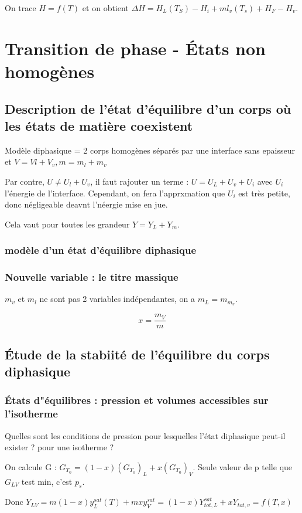 \documentclass[french]{yLectureNote}
\begin{document}
On trace $H=f(T)$ et on obtient $\Delta H = H_L(T_S)-H_i+ml_v(T_s)+H_F-H_v$.
\chapter{Transition de phase - États non homogènes}
\section{Description de l'état d'équilibre d'un corps où les états de matière coexistent}
Modèle diphasique = 2 corps homogènes séparés par une interface sans epaisseur et $V=Vl+V_v, m=m_l+m_v$

Par contre, $U \neq U_l+U_v$, il faut rajouter un terme : $U = U_L+U_v+U_i$ avec $U_i$ l'énergie de l'interface. Cependant, on fera l'apprxmation que $U_i$ est très petite, donc négligeable deavnt l'néergie mise en jue.

Cela vaut pour toutes les grandeur  $Y = Y_L+Y_m$.
\subsection{modèle d'un état d'équilibre diphasique}

\subsection{Nouvelle variable : le titre massique}
$m_v$ et $m_l$ ne sont pas 2 variables indépendantes, on a $m_L=m_m_v$.
\begin{definition}
    $$x = \frac{m_V}{m}$$
\end{definition}
\section{Étude de la stabiité de l'équilibre du corps diphasique}
\subsection{États d"équilibres : pression et volumes accessibles sur l'isotherme}
Quelles sont les conditions de pression pour lesquelles l'état diphasique peut-il exister ? pour une isotherme ?

On calcule G : $G_{T_0} = (1-x)(G_{T_0})_L+x(G_{T_0})_V$. Seule valeur de p telle que $G_{LV}$ test min, c'est $p_s$.

Donc $Y_{LV} = m(1-x)y_L^{sat}(T)+mxy_V^{sat} = (1-x)Y^{sat}_{tot,L} + x Y_{tot,v} = f(T,x)$
\end{document}
